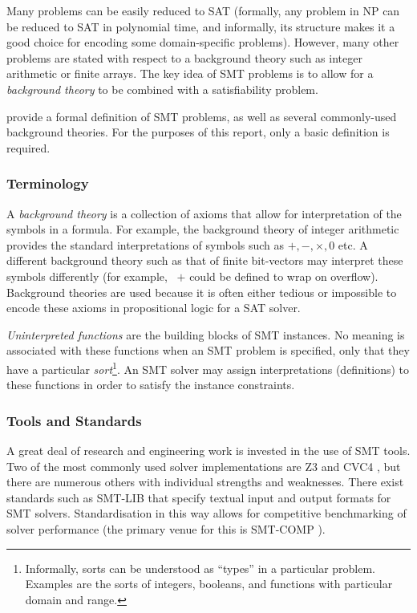 Many problems can be easily reduced to SAT (formally, any problem in NP can be
reduced to SAT in polynomial time, and informally, its structure makes it a good
choice for encoding some domain-specific problems). However, many other problems
are stated with respect to a background theory such as integer arithmetic or
finite arrays. The key idea of SMT problems is to allow for a \emph{background
theory} to be combined with a satisfiability problem.

\textcite[ch. 12]{biere_handbook_2009} provide a formal definition of SMT
problems, as well as several commonly-used background theories. For the purposes
of this report, only a basic definition is required.

\subsubsection{Terminology}

A \emph{background theory} is a collection of axioms that allow for
interpretation of the symbols in a formula. For example, the background theory
of integer arithmetic provides the standard interpretations of symbols such as $
+, -, \times, 0 $ etc. A different background theory such as that of finite
bit-vectors may interpret these symbols differently (for example, \ $+$ could be
defined to wrap on overflow). Background theories are used because it is often
either tedious or impossible to encode these axioms in propositional logic for a
SAT solver.

\emph{Uninterpreted functions} are the building blocks of SMT instances. No
meaning is associated with these functions when an SMT problem is specified,
only that they have a particular \emph{sort}\footnote{Informally, sorts can be
understood as ``types'' in a particular problem. Examples are the sorts of
integers, booleans, and functions with particular domain and range.}. An SMT
solver may assign interpretations (definitions) to these functions in order to
satisfy the instance constraints.

\subsubsection{Tools and Standards}

A great deal of research and engineering work is invested in the use of SMT
tools. Two of the most commonly used solver implementations are Z3
\cite{de_moura_z3:_2008} and CVC4 \cite{barrett_cvc4_2011}, but there are
numerous others with individual strengths and weaknesses. There exist standards
such as SMT-LIB \cite{BarFT-SMTLIB} that specify textual input and output
formats for SMT solvers. Standardisation in this way allows for competitive
benchmarking of solver performance (the primary venue for this is SMT-COMP
\cite{CDW14}).


